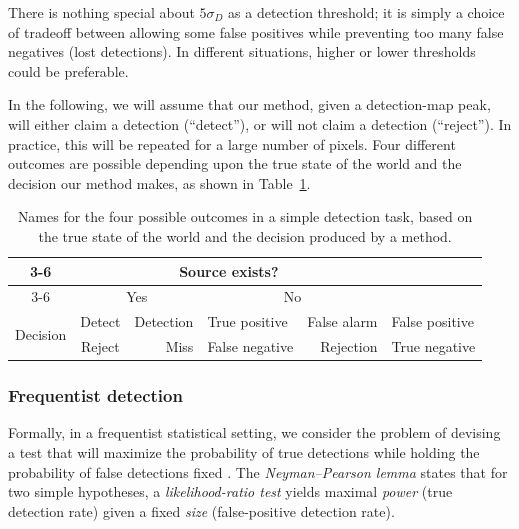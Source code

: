 \documentclass[11pt,letterpaper,linenumbers]{aastex7}
\newcommand{\sigd}{\sigma_{\scriptscriptstyle D}}
\newcommand\tstrut{\rule[-0.5ex]{0pt}{3ex}}
\begin{document}
There is nothing special about $5 \sigd$ as a detection threshold; it
is simply a choice of tradeoff between allowing some false positives
while preventing too many false negatives (lost detections).  In
different situations, higher or lower thresholds could be preferable.


In the following, we will assume that our method, given a
detection-map peak, will either claim a detection (``detect''), or will not claim a detection (``reject'').
In practice, this will be repeated for a large number of pixels.  Four
different outcomes are possible depending upon the true state of the
world and the decision our method makes, as shown in
Table~\ref{tab:outcomes}.

\begin{table}[h!]
\begin{center}
\begin{tabular}{|c|c|r@{ / }l|r@{ / }l|}
  \cline{3-6}
  \multicolumn{2}{c|}{} & \multicolumn{4}{c|}{Source exists? \tstrut} \\
  \cline{3-6}
  \multicolumn{2}{c|}{} & \multicolumn{2}{c|}{Yes} & \multicolumn{2}{c|}{No} \tstrut \\
  \hline
  \multirow{2}{*}{Decision} & Detect &
  Detection & True positive   &
  False alarm & False positive \tstrut \\
  \cline{2-6}
  & Reject &
  Miss & False negative &
  Rejection & True negative \tstrut \\
  \hline
\end{tabular}
\end{center}
\caption{Names for the four possible outcomes in a simple detection task,
  based on the true state of the world and the decision produced by a
  method.  \label{tab:outcomes}}
\end{table}


\subsubsection{Frequentist detection}
Formally, in a frequentist statistical setting, we consider the
problem of devising a test that will maximize the probability of true
detections while holding the probability of false detections fixed
\citep{scottnotes}.
The \emph{Neyman--Pearson lemma} \citep{neymanpearson} states that for
two simple hypotheses, a \emph{likelihood-ratio test} yields maximal
\emph{power} (true detection rate) given a fixed \emph{size}
(false-positive detection rate).
\end{document}
